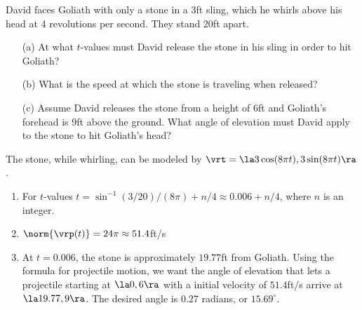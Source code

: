 {David faces Goliath with only a stone in a 3ft sling,  which he whirls above his head at 4 revolutions per second. They stand 20ft apart.
\begin{enumerate}
	\item [(a)]	At what $t$-values must David release the stone in his sling in order to hit Goliath?
	\item	[(b)] What is the speed at which the stone is traveling when released?
	\item	[(c)] Assume David releases the stone from a height of 6ft and Goliath's forehead is 9ft above the ground. What angle of elevation must David apply to the stone to hit Goliath's head?
\end{enumerate}
}
{The stone, while whirling, can be modeled by $\vrt = \la 3\cos(8\pi t),3\sin (8\pi t)\ra$. 
\begin{enumerate}
	\item For $t$-values $t=\sin^{-1}(3/20)/(8\pi) + n/4 \approx 0.006 + n/4$, where $n$ is an integer.
	\item		$\norm{\vrp(t)} = 24\pi\approx 51.4$ft/s
	\item		At $t=0.006$, the stone is approximately $19.77$ft from Goliath. Using the formula for projectile motion, we want the angle of elevation that lets a projectile starting at $\la 0,6\ra$ with a initial velocity of $51.4$ft/s arrive at $\la 19.77,9\ra$. The desired angle is $0.27$ radians, or $15.69^\circ$.
\end{enumerate}
}